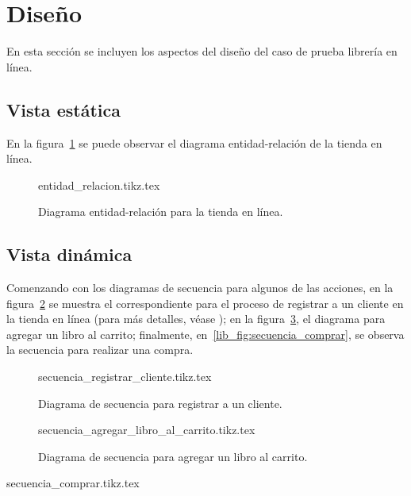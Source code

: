 %
%

\section{Diseño}
En esta sección se incluyen los aspectos del diseño del caso de prueba
librería en línea.

\subsection{Vista estática}
En la figura~\ref{lib_fig:entidad_relacion} se puede observar el diagrama
entidad-relación de la tienda en línea.

\begin{figure}
  \begin{center}
    {entidad_relacion.tikz.tex}
    \caption{Diagrama entidad-relación para la tienda en línea.}
    \label{lib_fig:entidad_relacion}
  \end{center}
\end{figure}

\subsection{Vista dinámica}
Comenzando con los diagramas de secuencia para algunos de las acciones, en la
figura~\ref{lib_fig:secuencia_registrar_cliente} se muestra el correspondiente
para el proceso de registrar a un cliente en la tienda en línea (para más
detalles, véase ); en la
figura~\ref{lib_fig:secuencia_agregar_libro_al_carrito}, el diagrama para
agregar un libro al carrito; finalmente, en~\ref{lib_fig:secuencia_comprar},
se observa la secuencia para realizar una compra.

\begin{figure}
  \begin{center}
    {secuencia_registrar_cliente.tikz.tex}
    \caption{Diagrama de secuencia para registrar a un cliente.}
    \label{lib_fig:secuencia_registrar_cliente}
  \end{center}
\end{figure}

\begin{figure}
  \begin{center}
    {secuencia_agregar_libro_al_carrito.tikz.tex}
    \caption{Diagrama de secuencia para agregar un libro al carrito.}
    \label{lib_fig:secuencia_agregar_libro_al_carrito}
  \end{center}
\end{figure}

\begin{sidewaysfigure}
  \begin{center}
    {secuencia_comprar.tikz.tex}
    \caption{Diagrama de secuencia para realizar una compra.}
    \label{lib_fig:secuencia_comprar}
  \end{center}
\end{sidewaysfigure}
